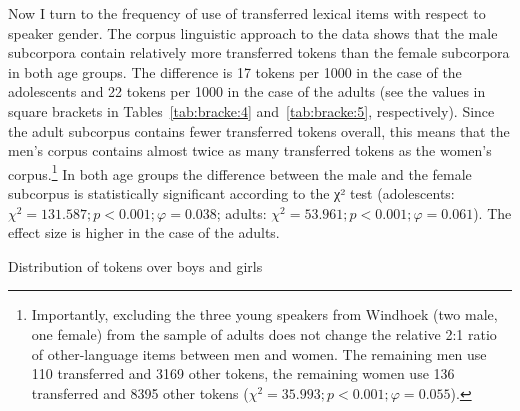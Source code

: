 \documentclass[output=paper]{langsci/langscibook}
\begin{document}
Now I turn to the frequency of use of transferred lexical items with respect to speaker gender. The corpus linguistic approach to the data shows that the male subcorpora contain relatively more transferred tokens than the female subcorpora in both age groups. The difference is 17 tokens per 1000 in the case of the adolescents and 22 tokens per 1000 in the case of the adults (see the values in square brackets in Tables~\ref{tab:bracke:4} and~\ref{tab:bracke:5}, respectively). Since the adult subcorpus contains fewer transferred tokens overall, this means that the men’s corpus contains almost twice as many transferred tokens as the women’s corpus.\footnote{Importantly, excluding the three young speakers from Windhoek (two male, one female) from the sample of adults does not change the relative 2:1 ratio of other-language items between men and women. The remaining men use 110 transferred and 3169 other tokens, the remaining women use 136 transferred and 8395 other tokens ($\chi^2 = 35.993; p < 0.001; \varphi = 0.055$).} In both age groups the difference between the male and the female subcorpus is statistically significant according to the χ² test (adolescents: $\chi^2 = 131.587; p < 0.001; \varphi = 0.038$; adults: $\chi^2 = 53.961; p < 0.001; \varphi = 0.061$). The effect size is higher in the case of the adults.

\begin{table}
\begin{floatrow}\captionsetup{margin=.1\textwidth}
{\caption{Distribution of tokens over boys and girls\label{tab:bracke:4}}}%
{\caption{Distribution of tokens over men and women\label{tab:bracke:5}}}
\end{floatrow}
\end{table}  
\end{document}
